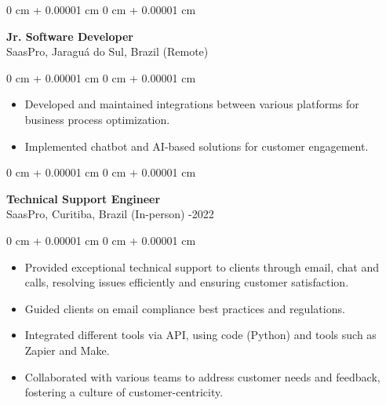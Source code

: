 \documentclass[10pt, letterpaper]{article}
\newenvironment{highlights}{
    \begin{itemize}[
        topsep=0.10 cm,
        parsep=0.10 cm,
        partopsep=0pt,
        itemsep=0pt,
        leftmargin=0 cm + 10pt
    ]
}{
    \end{itemize}
}
\newenvironment{onecolentry}{
    \begin{adjustwidth}{
        0 cm + 0.00001 cm
    }{
        0 cm + 0.00001 cm
    }
}{
    \end{adjustwidth}
}
\begin{document}
\vspace{0.2cm}

\begin{onecolentry}
    \setcolumnwidth{\fill, 4.5cm}
    \begin{paracol}{2}
        \textbf{Jr. Software Developer} \\ SaasPro, Jaraguá do Sul, Brazil (Remote)
        \switchcolumn
    \end{paracol}
\end{onecolentry}
\vspace{0.10cm}
\begin{onecolentry}
    \begin{highlights}
                \item Developed and maintained integrations between various platforms for business process optimization.
                \item Implemented chatbot and AI-based solutions for customer engagement.
    \end{highlights}
\end{onecolentry}

\vspace{0.2cm}

\begin{onecolentry}
    \setcolumnwidth{\fill, 4.5cm}
    \begin{paracol}{2}
        \textbf{Technical Support Engineer} \\ SaasPro, Curitiba, Brazil (In-person)
        \switchcolumn
        -2022
    \end{paracol}
\end{onecolentry}
\vspace{0.10cm}
\begin{onecolentry}
    \begin{highlights}
                \item Provided exceptional technical support to clients through email, chat and calls, resolving issues efficiently and ensuring customer satisfaction.
                \item Guided clients on email compliance best practices and regulations.
                \item Integrated different tools via API, using code (Python) and tools such as Zapier and Make.
                \item Collaborated with various teams to address customer needs and feedback, fostering a culture of customer-centricity.
    \end{highlights}
\end{onecolentry}
\end{document}
